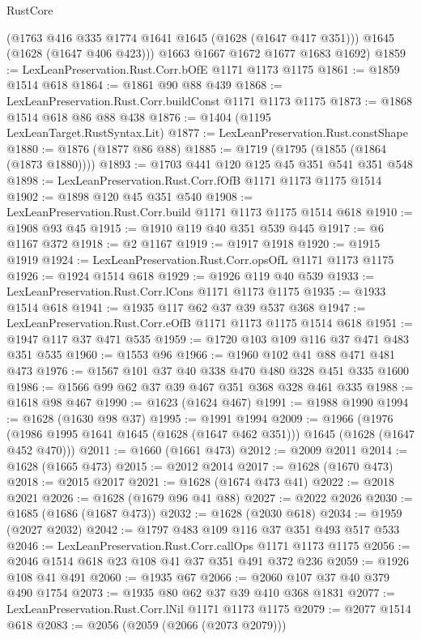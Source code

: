 \begin{lexlean}{RustCore}
\begin{coremodule}
        (@1763 @416 @335 @1774 @1641 @1645 (@1628 (@1647 @417 @351)))
        @1645
        (@1628 (@1647 @406 @423)))
      @1663
      @1667
      @1672
      @1677
      @1683
      @1692)
@1859 := LexLeanPreservation.Rust.Corr.bOfE @1171 @1173 @1175
@1861 := @1859 @1514 @618
@1864 := @1861 @90 @88 @439
@1868 := LexLeanPreservation.Rust.Corr.buildConst @1171 @1173 @1175
@1873 := @1868 @1514 @618 @86 @88 @438
@1876 := @1404 (@1195 LexLeanTarget.RustSyntax.Lit)
@1877 := LexLeanPreservation.Rust.constShape
@1880 := @1876 (@1877 @86 @88)
@1885 := @1719 (@1795 (@1855 (@1864 (@1873 @1880))))
@1893 := @1703 @441 @120 @125 @45 @351 @541 @351 @548
@1898 := LexLeanPreservation.Rust.Corr.fOfB @1171 @1173 @1175 @1514
@1902 := @1898 @120 @45 @351 @540
@1908 := LexLeanPreservation.Rust.Corr.build @1171 @1173 @1175 @1514 @618
@1910 := @1908 @93 @45
@1915 := @1910 @119 @40 @351 @539 @445
@1917 := @6 @1167 @372
@1918 := @2 @1167
@1919 := @1917 @1918
@1920 := @1915 @1919
@1924 := LexLeanPreservation.Rust.Corr.opsOfL @1171 @1173 @1175
@1926 := @1924 @1514 @618
@1929 := @1926 @119 @40 @539
@1933 := LexLeanPreservation.Rust.Corr.lCons @1171 @1173 @1175
@1935 := @1933 @1514 @618
@1941 := @1935 @117 @62 @37 @39 @537 @368
@1947 := LexLeanPreservation.Rust.Corr.eOfB @1171 @1173 @1175 @1514 @618
@1951 := @1947 @117 @37 @471 @535
@1959 := @1720 @103 @109 @116 @37 @471 @483 @351 @535
@1960 := @1553 @96
@1966 := @1960 @102 @41 @88 @471 @481 @473
@1976 := @1567 @101 @37 @40 @338 @470 @480 @328 @451 @335 @1600
@1986 := @1566 @99 @62 @37 @39 @467 @351 @368 @328 @461 @335
@1988 := @1618 @98 @467
@1990 := @1623 (@1624 @467)
@1991 := @1988 @1990
@1994 := @1628 (@1630 @98 @37)
@1995 := @1991 @1994
@2009 := @1966
    (@1976 (@1986 @1995 @1641 @1645 (@1628 (@1647 @462 @351))) @1645 (@1628 (@1647 @452 @470)))
@2011 := @1660 (@1661 @473)
@2012 := @2009 @2011
@2014 := @1628 (@1665 @473)
@2015 := @2012 @2014
@2017 := @1628 (@1670 @473)
@2018 := @2015 @2017
@2021 := @1628 (@1674 @473 @41)
@2022 := @2018 @2021
@2026 := @1628 (@1679 @96 @41 @88)
@2027 := @2022 @2026
@2030 := @1685 (@1686 (@1687 @473))
@2032 := @1628 (@2030 @618)
@2034 := @1959 (@2027 @2032)
@2042 := @1797 @483 @109 @116 @37 @351 @493 @517 @533
@2046 := LexLeanPreservation.Rust.Corr.callOps @1171 @1173 @1175
@2056 := @2046 @1514 @618 @23 @108 @41 @37 @351 @491 @372 @236
@2059 := @1926 @108 @41 @491
@2060 := @1935 @67
@2066 := @2060 @107 @37 @40 @379 @490 @1754
@2073 := @1935 @80 @62 @37 @39 @410 @368 @1831
@2077 := LexLeanPreservation.Rust.Corr.lNil @1171 @1173 @1175
@2079 := @2077 @1514 @618
@2083 := @2056 (@2059 (@2066 (@2073 @2079)))

\end{coremodule}
\end{lexlean}
